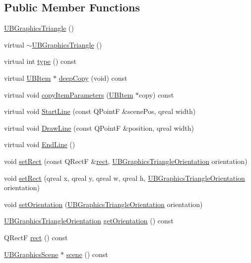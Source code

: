 \subsection*{Public Member Functions}
\begin{DoxyCompactItemize}
\item 
\hyperlink{class_u_b_graphics_triangle_a26f32ce7e272aa21d6383ceffcb86dbe}{U\-B\-Graphics\-Triangle} ()
\item 
virtual \hyperlink{class_u_b_graphics_triangle_a0809d5a1bbf6ca94ad110b30e479e8dd}{$\sim$\-U\-B\-Graphics\-Triangle} ()
\item 
virtual int \hyperlink{class_u_b_graphics_triangle_a58c76964940845148f07f6fe971049d9}{type} () const 
\item 
virtual \hyperlink{class_u_b_item}{U\-B\-Item} $\ast$ \hyperlink{class_u_b_graphics_triangle_ade6146ebb71b5eeee4266fb156c4fe76}{deep\-Copy} (void) const 
\item 
virtual void \hyperlink{class_u_b_graphics_triangle_ad90ae6a2a2237bb2f119d89c93be0c94}{copy\-Item\-Parameters} (\hyperlink{class_u_b_item}{U\-B\-Item} $\ast$copy) const 
\item 
virtual void \hyperlink{class_u_b_graphics_triangle_abe0cc44d86ce8bc6351d18e2d823dfaa}{Start\-Line} (const Q\-Point\-F \&scene\-Pos, qreal width)
\item 
virtual void \hyperlink{class_u_b_graphics_triangle_a00729819ed21c63155795ad1fdf5a1ba}{Draw\-Line} (const Q\-Point\-F \&position, qreal width)
\item 
virtual void \hyperlink{class_u_b_graphics_triangle_a99305717e50b989a64568f07b8aab7bd}{End\-Line} ()
\item 
void \hyperlink{class_u_b_graphics_triangle_a5ec5052dd2822862c5e27f973c07cf4d}{set\-Rect} (const Q\-Rect\-F \&\hyperlink{class_u_b_graphics_triangle_a893cf45d754e3d4ac0d85753b1b6c73c}{rect}, \hyperlink{class_u_b_graphics_triangle_a2bcbf42a1d36e4d35bbad30e742a2b65}{U\-B\-Graphics\-Triangle\-Orientation} orientation)
\item 
void \hyperlink{class_u_b_graphics_triangle_ac3779cb4d0959cd49db4ba70638904a5}{set\-Rect} (qreal x, qreal y, qreal w, qreal h, \hyperlink{class_u_b_graphics_triangle_a2bcbf42a1d36e4d35bbad30e742a2b65}{U\-B\-Graphics\-Triangle\-Orientation} orientation)
\item 
void \hyperlink{class_u_b_graphics_triangle_ab1afffb0752a15e39924ca03cb030d2e}{set\-Orientation} (\hyperlink{class_u_b_graphics_triangle_a2bcbf42a1d36e4d35bbad30e742a2b65}{U\-B\-Graphics\-Triangle\-Orientation} orientation)
\item 
\hyperlink{class_u_b_graphics_triangle_a2bcbf42a1d36e4d35bbad30e742a2b65}{U\-B\-Graphics\-Triangle\-Orientation} \hyperlink{class_u_b_graphics_triangle_a14f8d54a2e79d174b01a19635837e1e3}{get\-Orientation} () const 
\item 
Q\-Rect\-F \hyperlink{class_u_b_graphics_triangle_a893cf45d754e3d4ac0d85753b1b6c73c}{rect} () const 
\item 
\hyperlink{class_u_b_graphics_scene}{U\-B\-Graphics\-Scene} $\ast$ \hyperlink{class_u_b_graphics_triangle_a22bdd0bbf8e372cc2d1a1f83285c1250}{scene} () const 
\end{DoxyCompactItemize}
